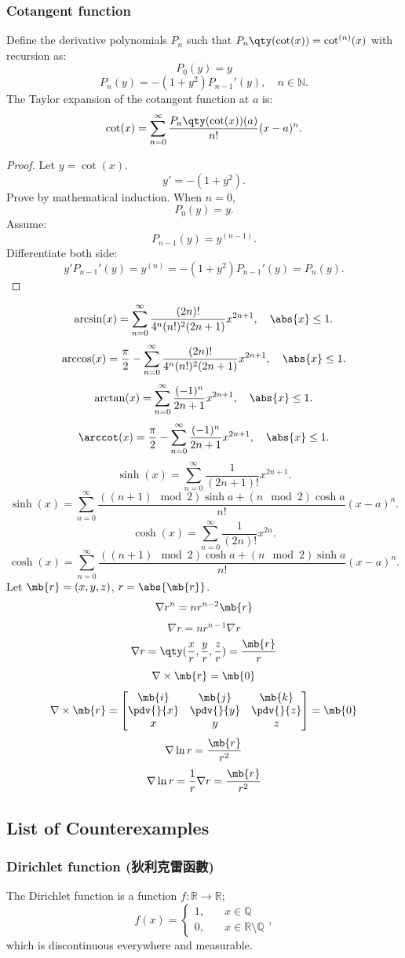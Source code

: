 \subsubsection{Cotangent function}
Define the derivative polynomials $P_n$ such that $P_n\qty(\cot(x))=\cot^{(n)}(x)$ with recursion as:
\[P_0(y)=y\]
\[P_n(y)=-(1+y^2)P_{n-1}'(y),\quad n\in\mathbb{N}.\]
The Taylor expansion of the cotangent function at $a$ is:
\[\cot(x)=\sum_{n=0}^{\infty}\frac{P_n\qty(\cot(x))(a)}{n!}(x-a)^n.\]
\begin{proof}
Let $y=\cot(x)$.
\[y'=-(1+y^2).\]
Prove by mathematical induction. When $n=0$,
\[P_0(y)=y.\]
Assume:
\[P_{n-1}(y)=y^{(n-1)}.\]
Differentiate both side:
\[y'P_{n-1}'(y)=y^{(n)}=-(1+y^2)P_{n-1}'(y)=P_n(y).\]
\end{proof}
\[\arcsin(x)=\sum_{n=0}^{\infty}\frac{(2n)!}{4^n(n!)^2(2n+1)}x^{2n+1},\quad\abs{x}\le1.\]
\[\arccos(x)=\frac{\pi}{2}-\sum_{n=0}^{\infty}\frac{(2n)!}{4^n(n!)^2(2n+1)}x^{2n+1},\quad\abs{x}\le1.\]
\[\arctan(x)=\sum_{n=0}^{\infty}\frac{(-1)^n}{2n+1}x^{2n+1},\quad\abs{x}\le1.\]
\[\arccot(x)=\frac{\pi}{2}-\sum_{n=0}^{\infty}\frac{(-1)^n}{2n+1}x^{2n+1},\quad\abs{x}\le1.\]
\[\sinh(x)=\sum_{n=0}^{\infty}\frac{1}{(2n+1)!}x^{2n+1}.\]
\[\sinh(x)=\sum_{n=0}^{\infty}\frac{((n+1)\mod 2)\sinh a+(n\mod 2)\cosh a}{n!}(x-a)^n.\]
\[\cosh(x)=\sum_{n=0}^{\infty}\frac{1}{(2n)!}x^{2n}.\]
\[\cosh(x)=\sum_{n=0}^{\infty}\frac{((n+1)\mod 2)\cosh a+(n\mod 2)\sinh a}{n!}(x-a)^n.\]
Let $\mb{r}=(x,y,z)$, $r=\abs{\mb{r}}$.
\[\nabla r^n=nr^{n-2}\mb{r}\]
\bpr
\[\nabla r=nr^{n-1}\nabla r\]
\[\nabla r=\qty(\frac{x}{r},\frac{y}{r},\frac{z}{r})=\frac{\mb{r}}{r}\]
\epr
{}
\[\nabla\times\mb{r}=\mb{0}\]
\bpr
\[\nabla\times\mb{r}=\begin{bmatrix}\mb{i}&\mb{j}&\mb{k}\\\pdv{}{x}&\pdv{}{y}&\pdv{}{z}\\x&y&z\end{bmatrix}=\mb{0}\]
\epr
{}
\[\nabla\ln r=\frac{\mb{r}}{r^2}\]
\bpr
\[\nabla\ln r=\frac{1}{r}\nabla r=\frac{\mb{r}}{r^2}\]
\epr
\subsection{List of Counterexamples}
\subsubsection{Dirichlet function (狄利克雷函數)}
The Dirichlet function is a function $f\colon\mathbb{R}\to\mathbb{R};$
\[f(x)=\begin{cases}1,\quad & x\in\mathbb{Q}\\
0,\quad & x\in\mathbb{R}\setminus\mathbb{Q}
\end{cases},\]
which is discontinuous everywhere and measurable.
